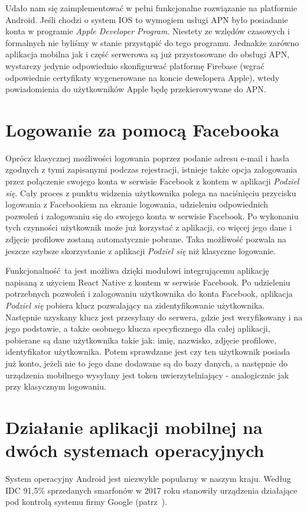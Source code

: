 \documentclass[licencjacka]{pracamgr}
\begin{document}
Udało nam się zaimplementować w pełni funkcjonalne rozwiązanie na platformie Android. Jeśli chodzi o system IOS to wymogiem usługi APN było posiadanie konta w programie \textit{Apple Developer Program}. Niestety ze wzlędów czasowych i formalnych nie byliśmy w stanie przystąpić do tego programu. Jednakże zarówno aplikacja mobilna jak i część serwerowa są już przystosowane do obsługi APN, wystarczy jedynie odpowiednio skonfigurwać platformę Firebase (wgrać odpowiednie certyfikaty wygenerowane na koncie dewelopera Apple), wtedy powiadomienia do użytkowników Apple będę przekierowywane do APN.  

\section{Logowanie za pomocą Facebooka}
Oprócz klasycznej możliwości logowania poprzez podanie adresu e-mail i hasła zgodnych z tymi zapisanymi podczas rejestracji, istnieje także opcja zalogowania przez połączenie swojego konta w serwisie Facebook z kontem w aplikacji \textit{Podziel się}. Cały proces z punktu widzenia użytkownika polega na naciśnięciu przycisku logowania z Facebookiem na ekranie logowania, udzieleniu odpowiednich pozwoleń i zalogowaniu się do swojego konta w serwisie Facebook. Po wykonaniu tych czynności użytkownik może już korzystać z aplikacji, co więcej jego dane i zdjęcie profilowe zostaną automatycznie pobrane. Taka możliwość pozwala na jeszcze szybsze skorzystanie z aplikacji \textit{Podziel się} niż klasyczne logowanie.

Funkcjonalność ta jest możliwa dzięki modułowi integrującemu aplikację napisaną z użyciem React Native z kontem w serwisie Facebook. Po udzieleniu potrzebnych pozwoleń i zalogowaniu użytkownika do konta Facebook, aplikacja \textit{Podziel się} pobiera klucz pozwalający na zidentyfikowanie użytkownika. Następnie uzyskany klucz jest przesyłany do serwera, gdzie jest weryfikowany i na jego podstawie, a także osobnego klucza specyficznego dla całej aplikacji, pobierane są dane użytkownika takie jak: imię, nazwisko, zdjęcie profilowe, identyfikator użytkownika. Potem sprawdzane jest czy ten użytkownik posiada już konto, jeżeli nie to jego dane dodawane są do bazy danych, a następnie do urządzenia mobilnego wysyłany jest token uwierzytelniający - analogicznie jak przy klasycznym logowaniu. 

\section{Działanie aplikacji mobilnej na dwóch systemach operacyjnych} 
System operacyjny Android jest niezwykle popularny w naszym kraju. Według IDC 91,5\% sprzedanych smarfonów w 2017 roku stanowiły urządzenia działające pod kontrolą systemu firmy Google (patrz~\cite{popluarnoscAndroid}).
\end{document}
